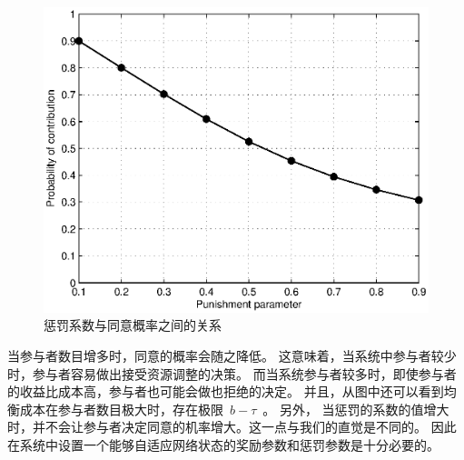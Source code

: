 \begin{figure}[!htb]
\begin{centering}
\includegraphics[scale=0.7]{../figures/bayesian_punish_parameter_vs_contribute_probability.eps}
\caption{惩罚系数与同意概率之间的关系}
\label{fig:bayesian_puni_para_vs_cont_prob}
\end{centering}
\end{figure}
当参与者数目增多时，同意的概率会随之降低。
这意味着，当系统中参与者较少时，参与者容易做出接受资源调整的决策。
而当系统参与者较多时，即使参与者的收益比成本高，参与者也可能会做也拒绝的决定。
并且，从图中还可以看到均衡成本在参与者数目极大时，存在极限~$b-\tau$~。
另外，
当惩罚的系数的值增大时，并不会让参与者决定同意的机率增大。这一点与我们的直觉是不同的。
因此在系统中设置一个能够自适应网络状态的奖励参数和惩罚参数是十分必要的。
